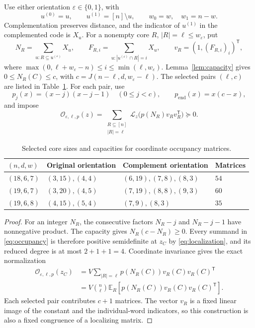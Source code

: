 \documentclass[11pt]{article}
\newcommand{\Lz}{\mathcal L_z}
\newcommand{\E}{\mathbb E}
\begin{document}
Use either orientation $\varepsilon\in\{0,1\}$, with
\[
 u^{(0)}=u,\qquad u^{(1)}=[n]\setminus u,\qquad w_0=w,\quad w_1=n-w.
\]
Complementation preserves distance, and the indicator of $u^{(1)}$ in the
complemented code is $X_u$. For a nonempty core $R$, $|R|=\ell\le w_\varepsilon$,
put
\[
 N_R=\sum_{u:R\subseteq u^{(\varepsilon)}}X_u,\qquad
 F_{R,i}=\sum_{u:|u^{(\varepsilon)}\cap R|=i}X_u,\qquad
 v_R=(1,(F_{R,i})_i)^{\mathsf T},
\]
where $\max(0,\ell+w_\varepsilon-n)\le i\le\min(\ell,w_\varepsilon)$.
Lemma~\ref{lem:capacity} gives $0\le N_R(C)\le c$, with
$c=J(n-\ell,d,w_\varepsilon-\ell)$. The selected pairs $(\ell,c)$ are listed
in Table~\ref{tab:cores}. For each pair, use
\[
 p_j(x)=(x-j)(x-j-1)\quad(0\le j<c),\qquad
 p_{\mathrm{end}}(x)=x(c-x),
\]
and impose
\begin{equation}\label{eq:occupancy}
 \mathcal O_{\varepsilon,\ell,p}(z)
 =\sum_{\substack{R\subseteq[n]\\|R|=\ell}}
 \Lz\bigl(p(N_R)v_Rv_R^{\mathsf T}\bigr)\succeq0.
\end{equation}

\begin{table}[htbp]
\centering
\caption{Selected core sizes and capacities for coordinate occupancy matrices.}
\label{tab:cores}
\small
\begin{tabular}{@{}llll@{}}
\toprule
$(n,d,w)$ & Original orientation & Complement orientation & Matrices\\
\midrule
$(18,6,7)$ & $(3,15),(4,4)$ & $(6,19),(7,8),(8,3)$ & $54$\\
$(19,6,7)$ & $(3,20),(4,5)$ & $(7,19),(8,8),(9,3)$ & $60$\\
$(19,6,8)$ & $(4,15),(5,4)$ & $(7,9),(8,3)$ & $35$\\
\bottomrule
\end{tabular}
\end{table}

\begin{proof}
For an integer $N_R$, the consecutive factors $N_R-j$ and $N_R-j-1$
have nonnegative product. The capacity gives $N_R(c-N_R)\ge0$.
Every summand in \eqref{eq:occupancy} is therefore positive semidefinite at
$z_C$ by \eqref{eq:localization}, and its reduced degree is at most
$2+1+1=4$. Coordinate invariance gives the exact normalization
\begin{equation}\label{eq:occupancy-normalization}
 \begin{split}
 \mathcal O_{\varepsilon,\ell,p}(z_C)
 &=V\sum_{|R|=\ell}p(N_R(C))v_R(C)v_R(C)^{\mathsf T}\\
 &=V\binom n\ell\E_R[p(N_R(C))v_R(C)v_R(C)^{\mathsf T}].
 \end{split}
\end{equation}
Each selected pair contributes $c+1$ matrices. The vector $v_R$ is a fixed
linear image of the constant and the individual-word indicators, so this
construction is also a fixed congruence of a localizing matrix.
\end{proof}
\end{document}
